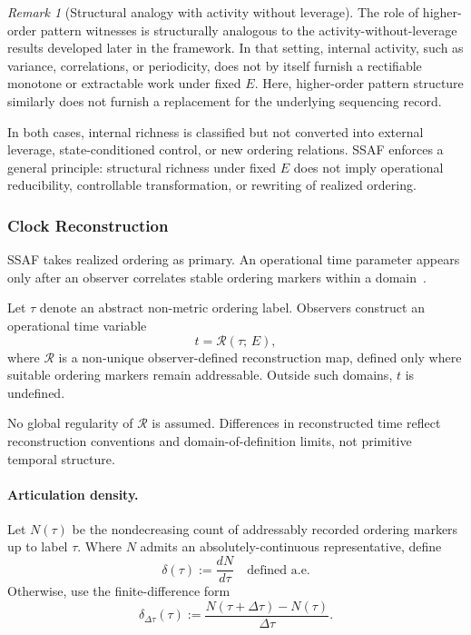 \documentclass[aps,prx,onecolumn,11pt]{revtex4-2}
\theoremstyle{plain}
\theoremstyle{definition}
\theoremstyle{remark}
\newtheorem{remark}{Remark}
\begin{document}
\begin{remark}[Structural analogy with activity without leverage]
\label{rem:structural_analogy_witnesses}
The role of higher-order pattern witnesses is structurally analogous to
the activity-without-leverage results developed later in the framework.
In that setting, internal activity, such as variance, correlations, or
periodicity, does not by itself furnish a rectifiable monotone or
extractable work under fixed \(E\). Here, higher-order pattern structure
similarly does not furnish a replacement for the underlying sequencing
record.

In both cases, internal richness is classified but not converted into
external leverage, state-conditioned control, or new ordering relations.
SSAF enforces a general principle: structural richness under fixed \(E\)
does not imply operational reducibility, controllable transformation, or
rewriting of realized ordering.
\end{remark}

\subsubsection{Clock Reconstruction}
\label{subsubsec:clock_reconstruction}

SSAF takes realized ordering as primary. An operational time parameter
appears only after an observer correlates stable ordering markers within
a domain~\cite{Rovelli1991,PageWootters1983,GambiniPullin2007}.

Let \(\tau\) denote an abstract non-metric ordering label. Observers
construct an operational time variable
\begin{equation}
t = \mathcal{R}(\tau;\,E),
\label{eq:clock_reconstruction_map}
\end{equation}
where \(\mathcal{R}\) is a non-unique observer-defined reconstruction
map, defined only where suitable ordering markers remain addressable.
Outside such domains, \(t\) is undefined.

No global regularity of \(\mathcal{R}\) is assumed. Differences in
reconstructed time reflect reconstruction conventions and
domain-of-definition limits, not primitive temporal structure.

\paragraph{Articulation density.}

Let \(N(\tau)\) be the nondecreasing count of addressably recorded
ordering markers up to label \(\tau\). Where \(N\) admits an
absolutely-continuous representative, define
\[
\delta(\tau)
:=
\frac{dN}{d\tau}
\quad
\text{defined a.e.}
\]
Otherwise, use the finite-difference form
\[
\delta_{\Delta\tau}(\tau)
:=
\frac{N(\tau+\Delta\tau)-N(\tau)}{\Delta\tau}.
\]
\end{document}
